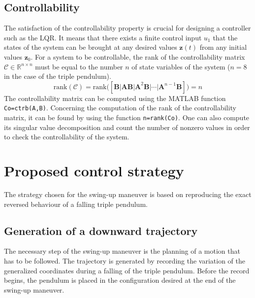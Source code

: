 \documentclass[a4paper,12pt]{article}
\begin{document}
\subsection{Controllability}
The satisfaction of the controllability property is crucial for designing a controller such as the LQR. It means that there exists a finite control input $u_1$ that the states of the system can be brought at any desired values $\mathbf{z}(t)$ from any initial values $\mathbf{z}_0$. For a system to be controllable, the rank of the controllability matrix $\mathcal{C}\in\mathbb{R}^{n\times n}$ must be equal to the number $n$ of state variables of the system ($n=8$ in the case of the triple pendulum).
\[ \text{rank}\left(\mathcal{C}\right) = \text{rank}\Big(\left[ \mathbf{B|AB|A}^2\mathbf{B}|\cdots|\mathbf{A}^{n-1}\mathbf{B} \right]\Big) =n \]
The controllability matrix can be computed using the MATLAB function \texttt{Co=ctrb(A,B)}. Concerning the computation of the rank of the controllability matrix, it can be found by using the function \texttt{n=rank(Co)}. One can also compute its singular value decomposition and count the number of nonzero values in order to check the controllability of the system.

\section{Proposed control strategy}
The strategy chosen for the swing-up maneuver is based on reproducing the exact reversed behaviour of a falling triple pendulum.

\subsection{Generation of a downward trajectory} \label{sec:down_trajectory}
The necessary step of the swing-up maneuver is the planning of a motion that has to be followed. The trajectory is generated by recording the variation of the generalized coordinates during a falling of the triple pendulum. Before the record begins, the pendulum is placed in the configuration desired at the end of the swing-up maneuver.
\end{document}
